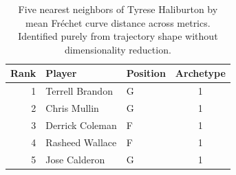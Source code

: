 \begin{table}[htbp]
  \centering\small
  \begin{tabular}{rllc}
    \toprule
    Rank & Player & Position & Archetype \\
    \midrule
    1 & Terrell Brandon & G & 1 \\
    2 & Chris Mullin & G & 1 \\
    3 & Derrick Coleman & F & 1 \\
    4 & Rasheed Wallace & F & 1 \\
    5 & Jose Calderon & G & 1 \\
    \bottomrule
  \end{tabular}
  \caption{Five nearest neighbors of Tyrese Haliburton by mean Fr\'{e}chet curve distance across metrics. Identified purely from trajectory shape without dimensionality reduction.}
  \label{tab:Tyrese_Haliburton_frechet_curve_neighbors}
\end{table}

